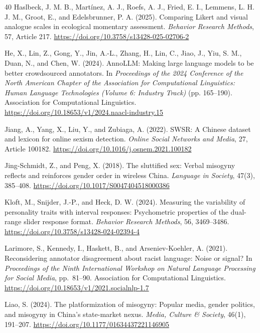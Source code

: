 \documentclass[a4paper,fleqn,review]{cas-sc}
\begin{document}
\begin{thebibliography}{40}
Haslbeck, J. M. B., Mart\'inez, A. J., Roefs, A. J., Fried, E. I., Lemmens, L. H. J. M., Groot, E., and Edelsbrunner, P. A. (2025).
Comparing Likert and visual analogue scales in ecological momentary assessment.
\emph{Behavior Research Methods}, 57, Article 217.
\url{https://doi.org/10.3758/s13428-025-02706-2}

He, X., Lin, Z., Gong, Y., Jin, A.-L., Zhang, H., Lin, C., Jiao, J., Yiu, S. M., Duan, N., and Chen, W. (2024).
AnnoLLM: Making large language models to be better crowdsourced annotators.
In \emph{Proceedings of the 2024 Conference of the North American Chapter of the Association for Computational Linguistics: Human Language Technologies (Volume 6: Industry Track)} (pp. 165--190).
Association for Computational Linguistics.
\url{https://doi.org/10.18653/v1/2024.naacl-industry.15}

Jiang, A., Yang, X., Liu, Y., and Zubiaga, A. (2022).
SWSR: A Chinese dataset and lexicon for online sexism detection.
\emph{Online Social Networks and Media}, 27, Article 100182.
\url{https://doi.org/10.1016/j.osnem.2021.100182}

Jing-Schmidt, Z., and Peng, X. (2018).
The sluttified sex: Verbal misogyny reflects and reinforces gender order in wireless China.
\emph{Language in Society}, 47(3), 385--408.
\url{https://doi.org/10.1017/S0047404518000386}

Kloft, M., Snijder, J.-P., and Heck, D. W. (2024).
Measuring the variability of personality traits with interval responses: Psychometric properties of the dual-range slider response format.
\emph{Behavior Research Methods}, 56, 3469--3486.
\url{https://doi.org/10.3758/s13428-024-02394-4}

Larimore, S., Kennedy, I., Haskett, B., and Arseniev-Koehler, A. (2021).
Reconsidering annotator disagreement about racist language: Noise or signal?
In \emph{Proceedings of the Ninth International Workshop on Natural Language Processing for Social Media}, pp.~81--90. Association for Computational Linguistics.
\url{https://doi.org/10.18653/v1/2021.socialnlp-1.7}

Liao, S. (2024).
The platformization of misogyny: Popular media, gender politics, and misogyny in China's state-market nexus.
\emph{Media, Culture \& Society}, 46(1), 191--207.
\url{https://doi.org/10.1177/01634437221146905}


\end{thebibliography}
\end{document}
